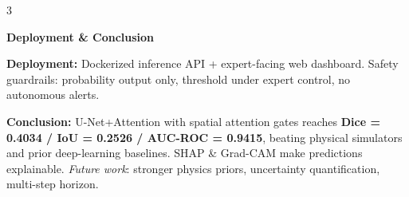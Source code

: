 \documentclass[a0,landscape]{a0poster}
\newcommand{\sectitle}[1]{%
  \par\noindent\colorbox{FireRed!15}{%
    \parbox{\linewidth}{%
      \vspace{0.12em}%
      {\Large\bfseries\color{FireRed} \hspace{0.3em}#1}%
      \vspace{0.12em}%
    }%
  }\par\vspace{0.1em}%
}
\newcommand{\greenbox}[1]{%
  \begin{tcolorbox}[
    colback=ForestGreen!10,colframe=ForestGreen,
    arc=3pt,boxrule=1pt,
    left=4pt,right=4pt,top=3pt,bottom=3pt
  ]{\small #1}\end{tcolorbox}%
}
\begin{document}
\begin{multicols}{3}
\vspace{0.15em}
\sectitle{Deployment \& Conclusion}

\textbf{Deployment:} Dockerized inference API + expert-facing web dashboard.
Safety guardrails: probability output only, threshold under expert control, no autonomous alerts.

\vspace{0.1em}
\greenbox{%
  \textbf{Conclusion:} U-Net+Attention with spatial attention gates reaches
  \textbf{Dice = 0.4034 / IoU = 0.2526 / AUC-ROC = 0.9415},
  beating physical simulators and prior deep-learning baselines.
  SHAP \& Grad-CAM make predictions explainable.
  \textit{Future work}: stronger physics priors, uncertainty quantification, multi-step horizon.
}

\end{multicols}
\end{document}

